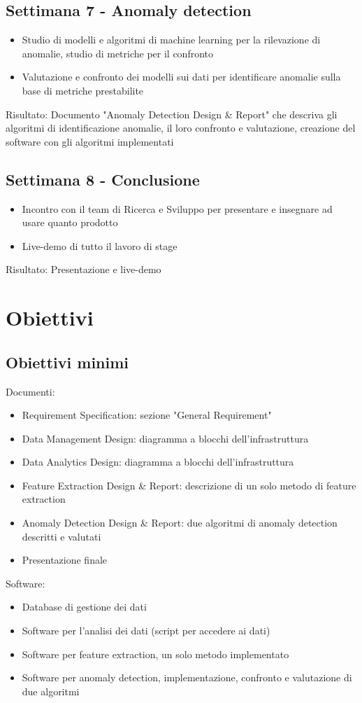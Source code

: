 \subsection{Settimana 7 - Anomaly detection}

\begin{itemize}
	\item Studio di modelli e algoritmi di machine learning per la rilevazione di anomalie, studio di metriche per il confronto
	\item Valutazione e confronto dei modelli sui dati per identificare anomalie sulla base di metriche prestabilite
\end{itemize}
Risultato: Documento "Anomaly Detection Design \& Report" che descriva gli algoritmi di identificazione anomalie, il loro confronto e valutazione, creazione del software con gli algoritmi implementati

\subsection{Settimana 8 - Conclusione}

\begin{itemize}
	\item Incontro con il team di Ricerca e Sviluppo per presentare e insegnare ad usare quanto prodotto
	\item Live-demo di tutto il lavoro di stage
\end{itemize}
Risultato: Presentazione e live-demo

\section{Obiettivi}

\subsection{Obiettivi minimi}
Documenti:
\begin{itemize}
	\item Requirement Specification: sezione "General Requirement"
	\item Data Management Design: diagramma a blocchi dell'infrastruttura
	\item Data Analytics Design: diagramma a blocchi dell'infrastruttura
	\item Feature Extraction Design \& Report: descrizione di un solo metodo di
	feature extraction
	\item Anomaly Detection Design \& Report: due algoritmi di anomaly detection descritti e valutati
	\item Presentazione finale
\end{itemize}
Software:
\begin{itemize}
	\item Database di gestione dei dati
	\item Software per l'analisi dei dati (script per accedere ai dati)
	\item Software per feature extraction, un solo metodo implementato
	\item Software per anomaly detection, implementazione, confronto e valutazione di due algoritmi
\end{itemize}

